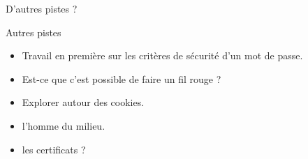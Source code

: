 \documentclass[12pt]{beamer}
\begin{document}
\begin{frame}[standout]
    \begin{center}
        \Huge
        D'autres pistes ?\\
    \end{center}
\end{frame}


\begin{frame}{Autres pistes}\pause
    \begin{itemize}
        \item Travail en première sur les critères de sécurité d'un mot de passe.
        \item Est-ce que c'est possible de faire un fil rouge ?
        \item Explorer autour des cookies.
        \item l'homme du milieu.
        \item les certificats ?
    \end{itemize}
\end{frame}

\end{document}

